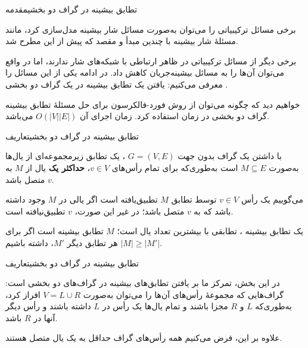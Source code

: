 \begin{itemframe-s}{تطابق بیشینه در گراف دو بخشی}{مقدمه}
\item[-]
برخی مسائل ترکیبیاتی را می‌توان به‌صورت مسائل شار بیشینه‌ مدل‌سازی کرد، مانند مسئلهٔ شار بیشینه با چندین مبدأ و مقصد که پیش از این مطرح شد.

\item[-]
برخی دیگر از مسائل ترکیبیاتی در ظاهر ارتباطی با شبکه‌های شار ندارند، اما در واقع می‌توان آن‌ها را به مسائل بیشینه‌جریان کاهش داد. در ادامه یکی از این مسائل را معرفی می‌کنیم:
 یافتن یک تطابق بیشینه در یک گراف دو بخشی
 .

\item[-]
خواهیم دید که چگونه می‌توان از روش فورد-فالکرسون برای حل مسئلهٔ تطابق بیشینه گراف دو بخشی
 در زمان استفاده کرد. زمان اجرای آن $O(|V||E|)$ می‌باشد.
\end{itemframe-s}


\begin{itemframe-s}{تطابق بیشینه در گراف دو بخشی}{تعاریف}
\item[-]
با داشتن یک گراف بدون جهت
$G = (V, E)$
، یک تطابق
 زیرمجموعه‌ای از یال‌ها به‌صورت
$M \subseteq E$
 است به‌طوری‌که برای تمام رأس‌های
$v \in V$،
 \textbf{حداکثر یک}
 یال از $M$ به $v$ متصل باشد.
\item[-]

می‌گوییم یک رأس $v \in V$ توسط تطابق $M$ تطبیق‌یافته
است اگر یالی در $M$ وجود داشته باشد که به $v$ متصل باشد؛ در غیر این صورت، $v$ تطبیق‌نیافته
 است.

\item[-]
یک تطابق بیشینه
، تطابقی با بیشترین تعداد یال است؛ $M$ تطابق بیشینه است اگر برای هر تطابق دیگر $M'$، داشته باشیم
$|M| \geq |M'|$.

\end{itemframe-s}


\begin{itemframe-s}{تطابق بیشینه در گراف دو بخشی}{تعاریف}
\item[-]
در این بخش، تمرکز ما بر یافتن تطابق‌های بیشینه در گراف‌های دو بخشی
 است: گراف‌هایی که مجموعهٔ رأس‌های آن‌ها را می‌توان به‌صورت
$V = L \cup R$
افراز کرد، به‌طوری‌که $L$ و $R$ مجزا باشند و تمام یال‌ها یک رأس در $L$ داشته باشند و رأس دیگر آنها در $R$ باشد.
\item[-]
علاوه بر این، فرض می‌کنیم همه رأس‌های گراف حداقل به یک یال متصل هستند.
\end{itemframe-s}



